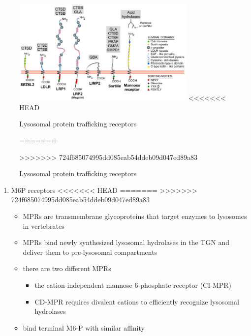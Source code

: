 \documentclass[fontsize=12pt]{scrartcl}
\begin{document}
\begin{enumerate}
\begin{enumerate}
\begin{enumerate}
\begin{enumerate}
\begin{table}[htbp]
\begin{figure}[htbp]
\centering
\includegraphics[width=0.8\textwidth]{./figures/lysosome_trafficking.jpeg}
<<<<<<< HEAD
\caption[Lysosomal protein trafficking receptors]{\label{fig:org82d936e}Lysosomal protein trafficking receptors}
=======
\caption[Lysosomal protein trafficking receptors]{\label{fig:org78ce0dd}
Lysosomal protein trafficking receptors}
>>>>>>> 724f685074995dd085eab54ddeb09d047ed89a83
\end{figure}

\begin{enumerate}
\item M6P receptors
<<<<<<< HEAD
\label{sec:org9c6c007}
=======
\label{sec:org00263c0}
>>>>>>> 724f685074995dd085eab54ddeb09d047ed89a83
\begin{itemize}
\item MPRs are transmembrane glycoproteins that target enzymes to lysosomes in vertebrates
\item MPRs bind newly synthesized lysosomal hydrolases in the TGN and deliver them to pre-lysosomal compartments
\item there are two different MPRs
\begin{itemize}
\item the cation-independent mannose 6-phosphate receptor (CI-MPR)
\item CD-MPR requires divalent cations to efficiently recognize lysosomal hydrolases
\end{itemize}
\item bind terminal M6-P with similar affinity
\end{itemize}


\end{enumerate}
\end{table}
\end{enumerate}
\end{enumerate}
\end{enumerate}
\end{enumerate}
\end{document}
